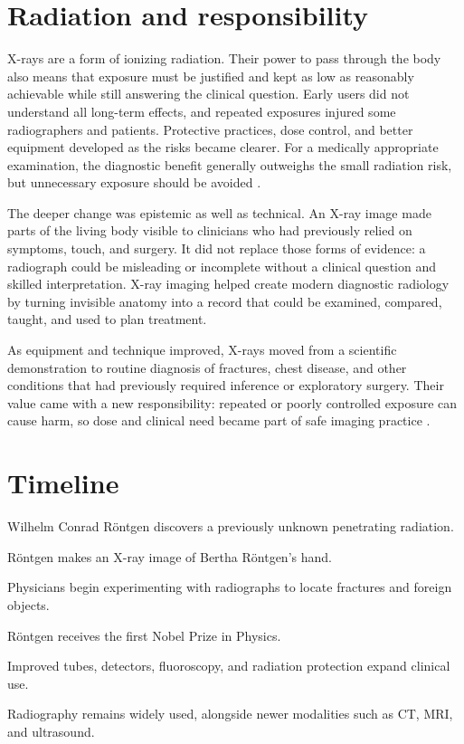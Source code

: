 \documentclass[12pt,oneside]{book}
\begin{document}
\section{Radiation and responsibility}
X-rays are a form of ionizing radiation. Their power to pass through the body
also means that exposure must be justified and kept as low as reasonably
achievable while still answering the clinical question. Early users did not
understand all long-term effects, and repeated exposures injured some
radiographers and patients. Protective practices, dose control, and better
equipment developed as the risks became clearer. For a medically appropriate
examination, the diagnostic benefit generally outweighs the small radiation
risk, but unnecessary exposure should be avoided
\cite{fdaMedicalXray,howellXray}.

The deeper change was epistemic as well as technical. An X-ray image made
parts of the living body visible to clinicians who had previously relied on
symptoms, touch, and surgery. It did not replace those forms of evidence: a
radiograph could be misleading or incomplete without a clinical question and
skilled interpretation. X-ray imaging helped create modern diagnostic
radiology by turning invisible anatomy into a record that could be examined,
compared, taught, and used to plan treatment.

As equipment and technique improved, X-rays moved from a scientific
demonstration to routine diagnosis of fractures, chest disease, and other
conditions that had previously required inference or exploratory surgery.
Their value came with a new responsibility: repeated or poorly controlled
exposure can cause harm, so dose and clinical need became part of safe imaging
practice \cite{howellXray,fdaMedicalXray}.

\section*{Timeline}
\begin{description}[leftmargin=2.3cm,style=nextline]
  \item[November 1895] Wilhelm Conrad R\"ontgen discovers a previously unknown penetrating radiation.
  \item[December 1895] R\"ontgen makes an X-ray image of Bertha R\"ontgen's hand.
  \item[1896] Physicians begin experimenting with radiographs to locate fractures and foreign objects.
  \item[1901] R\"ontgen receives the first Nobel Prize in Physics.
  \item[Twentieth century] Improved tubes, detectors, fluoroscopy, and radiation protection expand clinical use.
  \item[Today] Radiography remains widely used, alongside newer modalities such as CT, MRI, and ultrasound.
\end{description}
\end{document}

